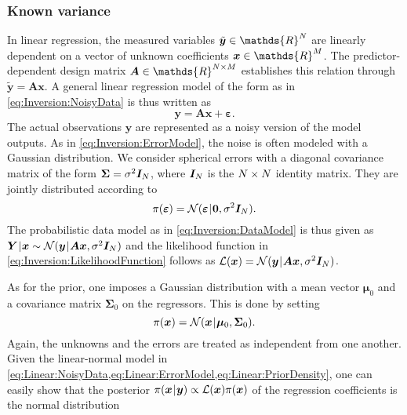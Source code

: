 \subsubsection{Known variance}
In linear regression, the measured variables \(\tilde{\bm{y}} \in \mathds{R}^\dimData\) are linearly dependent on a vector of unknown coefficients \(\bm{x} \in \mathds{R}^\dimParam\).
The predictor-dependent design matrix \(\bm{A} \in \mathds{R}^{\dimData \times \dimParam}\) establishes this relation through \(\tilde{\bm{y}} = \bm{A} \bm{x}\).
A general linear regression model of the form as in \cref{eq:Inversion:NoisyData} is thus written as
\begin{equation} \label{eq:Linear:NoisyData}
  \bm{y} = \bm{A} \bm{x} + \bm{\varepsilon}.
\end{equation}
The actual observations \(\bm{y}\) are represented as a noisy version of the model outputs.
As in \cref{eq:Inversion:ErrorModel}, the noise is often modeled with a Gaussian distribution.
We consider spherical errors with a diagonal covariance matrix of the form \(\bm{\Sigma} = \sigma^2 \bm{I}_N\),
where \(\bm{I}_N\) is the \(N \times N\) identity matrix.
They are jointly distributed according to
\begin{equation} \label{eq:Linear:ErrorModel}
  \pi(\bm{\varepsilon}) = \mathcal{N}(\bm{\varepsilon} {\:\!}|{\:\!} \bm{0}, \sigma^2 \bm{I}_N).
\end{equation}
The probabilistic data model as in \cref{eq:Inversion:DataModel} is thus given as \(\bm{Y} {\:\!}|{\:\!} \bm{x} \sim \mathcal{N}(\bm{y} {\:\!}|{\:\!} \bm{A} \bm{x}, \sigma^2 \bm{I}_N)\)
and the likelihood function in \cref{eq:Inversion:LikelihoodFunction} follows as \(\mathcal{L}(\bm{x}) = \mathcal{N}(\bm{y} {\:\!}|{\:\!} \bm{A} \bm{x}, \sigma^2 \bm{I}_N)\).
\par %
As for the prior, one imposes a Gaussian distribution with a mean vector \(\bm{\mu}_0\) and a covariance matrix \(\bm{\Sigma}_0\) on the regressors.
This is done by setting
\begin{equation} \label{eq:Linear:PriorDensity}
  \pi(\bm{x}) = \mathcal{N}(\bm{x} {\:\!}|{\:\!} \bm{\mu}_0, \bm{\Sigma}_0).
\end{equation}
Again, the unknowns and the errors are treated as independent from one another.
Given the linear-normal model in \cref{eq:Linear:NoisyData,eq:Linear:ErrorModel,eq:Linear:PriorDensity},
one can easily show that the posterior \(\pi(\bm{x} {\:\!}|{\:\!} \bm{y}) \propto \mathcal{L}(\bm{x}) \pi(\bm{x})\) of the regression coefficients is the normal distribution
